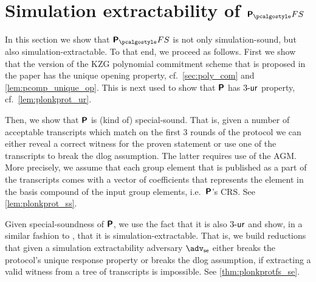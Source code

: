 \let\accentvec\vec \documentclass[runningheads,10pt]{llncs}
\begin{document}
\section{Simulation extractability of $\plonkprotfs$} 
In this section we show that $\plonkprotfs$
is not only simulation-sound, but also simulation-extractable. To that end, we
proceed as follows. 
First we show that the version of the KZG polynomial commitment scheme that is proposed in the \plonk{} paper has the unique opening property, cf.~\cref{sec:poly_com} and \cref{lem:pcomp_unique_op}. This is next used to show that $\bm{\mathsf{P}}$ has ${3\text{-}\mathsf{ur}}$ property, cf.~\cref{lem:plonkprot_ur}.

Then, we show that 
$\bm{\mathsf{P}}$ is (kind of) special-sound. That is, given a number of acceptable
transcripts which match on the first 3 rounds of the protocol we can either
reveal a correct witness for the proven statement or use one of the transcripts
to break the dlog assumption. The latter requires use of the AGM. More
precisely, we assume that each group element that is published as a part of the
transcripts comes with a vector of coefficients that represents the element in
the basis compound of the input group elements, i.e.~$\bm{\mathsf{P}}$'s CRS. See \cref{lem:plonkprot_ss}.

Given special-soundness of $\bm{\mathsf{P}}$, we use the fact that it is also ${3\text{-}\mathsf{ur}}$ and show, in a similar fashion to \cite{INDOCRYPT:FKMV12}, that it is simulation-extractable. That is, we build reductions that given a simulation extractability adversary $\advse$ either breaks the protocol's unique response property or breaks the dlog assumption, if extracting a valid witness from a tree of transcripts is impossible. See \cref{thm:plonkprotfs_se}.
\end{document}
